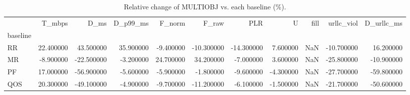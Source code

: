 \begin{table}
\caption{Relative change of MULTIOBJ vs. each baseline (\%).}
\label{tab:pct}
\begin{tabular}{lrrrrrrrrrr}
\toprule
 & T_mbps & D_ms & D_p99_ms & F_norm & F_raw & PLR & U & fill & urllc_viol & D_urllc_ms \\
baseline &  &  &  &  &  &  &  &  &  &  \\
\midrule
RR & 22.400000 & 43.500000 & 35.900000 & -9.400000 & -10.300000 & -14.300000 & 7.600000 & NaN & -10.700000 & 16.200000 \\
MR & -8.900000 & -22.500000 & -3.200000 & 24.700000 & 34.200000 & -7.000000 & 3.600000 & NaN & -25.800000 & -10.900000 \\
PF & 17.000000 & -56.900000 & -5.600000 & -5.900000 & -1.800000 & -9.600000 & -4.300000 & NaN & -27.700000 & -59.800000 \\
QOS & 20.300000 & -49.100000 & -4.900000 & -9.700000 & -11.200000 & -6.100000 & -1.500000 & NaN & -21.700000 & -50.600000 \\
\bottomrule
\end{tabular}
\end{table}
